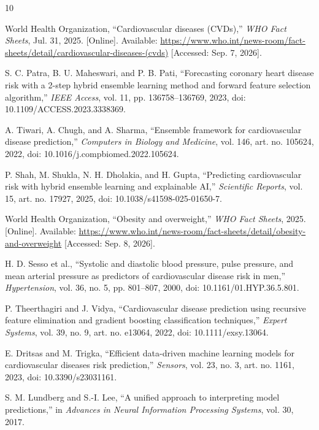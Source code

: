 \documentclass[11pt,a4paper]{article}
\begin{document}
\clearpage
\begin{thebibliography}{10}

World Health Organization,
``Cardiovascular diseases (CVDs),''
\textit{WHO Fact Sheets}, Jul. 31, 2025.
[Online]. Available:
\url{https://www.who.int/news-room/fact-sheets/detail/cardiovascular-diseases-(cvds)}
[Accessed: Sep. 7, 2026].

S. C. Patra, B. U. Maheswari, and P. B. Pati,
``Forecasting coronary heart disease risk with a 2-step hybrid ensemble learning method and forward feature selection algorithm,''
\textit{IEEE Access}, vol. 11, pp. 136758--136769, 2023,
doi: 10.1109/ACCESS.2023.3338369.

A. Tiwari, A. Chugh, and A. Sharma,
``Ensemble framework for cardiovascular disease prediction,''
\textit{Computers in Biology and Medicine}, vol. 146, art. no. 105624, 2022,
doi: 10.1016/j.compbiomed.2022.105624.

P. Shah, M. Shukla, N. H. Dholakia, and H. Gupta,
``Predicting cardiovascular risk with hybrid ensemble learning and explainable AI,''
\textit{Scientific Reports}, vol. 15, art. no. 17927, 2025,
doi: 10.1038/s41598-025-01650-7.

World Health Organization,
``Obesity and overweight,''
\textit{WHO Fact Sheets}, 2025.
[Online]. Available:
\url{https://www.who.int/news-room/fact-sheets/detail/obesity-and-overweight}
[Accessed: Sep. 8, 2026].

H. D. Sesso et al.,
``Systolic and diastolic blood pressure, pulse pressure, and mean
arterial pressure as predictors of cardiovascular disease risk in men,''
\textit{Hypertension}, vol. 36, no. 5, pp. 801--807, 2000,
doi: 10.1161/01.HYP.36.5.801.

P. Theerthagiri and J. Vidya,
``Cardiovascular disease prediction using recursive feature elimination and gradient boosting classification techniques,''
\textit{Expert Systems}, vol. 39, no. 9, art. no. e13064, 2022,
doi: 10.1111/exsy.13064.

E. Dritsas and M. Trigka,
``Efficient data-driven machine learning models for cardiovascular diseases risk prediction,''
\textit{Sensors}, vol. 23, no. 3, art. no. 1161, 2023,
doi: 10.3390/s23031161.

S. M. Lundberg and S.-I. Lee,
``A unified approach to interpreting model predictions,''
in \textit{Advances in Neural Information Processing Systems},
vol. 30, 2017.


\end{thebibliography}
\end{document}
